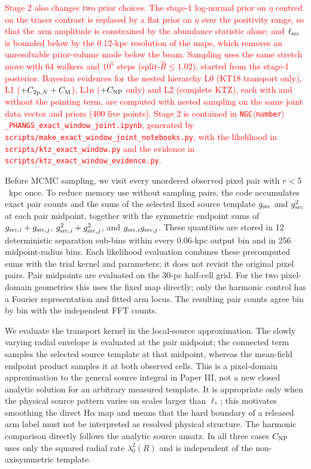\documentclass[fleqn,usenatbib]{mnras}
\newcommand{\revadd}[1]{\textcolor{red}{#1}}
\begin{document}
\revadd{Stage 2 also changes two prior choices.  The stage-1 log-normal prior on $\eta$ centred on the tracer contrast is replaced by a flat prior on $\eta$ over the positivity range, so that the arm amplitude is constrained by the abundance statistic alone; and $\ell_{\rm src}$ is bounded below by the 0.12-kpc resolution of the maps, which removes an unresolvable prior-volume mode below the beam.  Sampling uses the same stretch move with 64 walkers and $10^5$ steps (split-$\widehat R\le1.02$), started from the stage-1 posterior.  Bayesian evidences for the nested hierarchy L0 (KT18 transport only), L1 ($+C_{{\rm 2p},N}+C_{\rm M}$), L1n ($+C_{\rm NP}$ only) and L2 (complete KTZ), each with and without the pointing term, are computed with nested sampling \citep[\texttt{dynesty},][]{Speagle2020} on the same joint data vector and priors (400 live points).  Stage 2 is contained in \texttt{NGC$\langle$number$\rangle$\_PHANGS\_\allowbreak exact\_window\_joint.ipynb}, generated by \texttt{scripts/make\_exact\_window\_joint\_notebooks.py}, with the likelihood in \texttt{scripts/ktz\_exact\_window.py} and the evidence in \texttt{scripts/ktz\_exact\_window\_evidence.py}.}

Before MCMC sampling, we visit every unordered observed pixel pair with $r<5$~kpc once.  To reduce memory use without sampling pairs, the code accumulates exact pair counts and the sums of the selected fixed source template $g_{\rm src}$ and $g_{\rm src}^2$ at each pair midpoint, together with the symmetric endpoint sums of $g_{{\rm src},i}+g_{{\rm src},j}$, $g_{{\rm src},i}^2+g_{{\rm src},j}^2$, and $g_{{\rm src},i}g_{{\rm src},j}$.  These quantities are stored in 12 deterministic separation sub-bins within every 0.06-kpc output bin and in 256 midpoint-radius bins.  Each likelihood evaluation combines these precomputed sums with the trial kernel and parameters; it does not revisit the original pixel pairs.  Pair midpoints are evaluated on the 30-pc half-cell grid.  For the two pixel-domain geometries this uses the fixed map directly; only the harmonic control has a Fourier representation and fitted arm locus.  The resulting pair counts agree bin by bin with the independent FFT counts.

We evaluate the transport kernel in the local-source approximation.  The slowly varying radial envelope is evaluated at the pair midpoint; the connected term samples the selected source template at that midpoint, whereas the mean-field endpoint product samples it at both observed cells.  This is a pixel-domain approximation to the general source integral in Paper III, not a new closed analytic solution for an arbitrary measured template.  It is appropriate only when the physical source pattern varies on scales larger than $\ell_\ast$; this motivates smoothing the direct H$\alpha$ map and means that the hard boundary of a released arm label must not be interpreted as resolved physical structure.  The harmonic comparison directly follows the analytic source ansatz.  In all three cases $C_{\rm NP}$ uses only the squared radial rate $\lambda_0^2(R)$ and is independent of the non-axisymmetric template.
\end{document}

